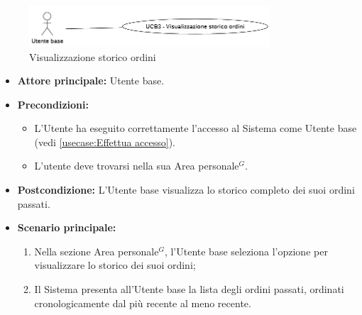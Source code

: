 \label{usecase:Storico ordini}

\begin{figure}[h]
	\centering
	\includegraphics[width=0.8\textwidth]{./uml/UCB3.png} 
	\caption{Visualizzazione storico ordini}
	\label{fig:UCB3}
  \end{figure}

\begin{itemize}
	\item \textbf{Attore principale:} Utente base.

	\item \textbf{Precondizioni:}
	      \begin{itemize}
		      \item L'Utente ha eseguito correttamente l'accesso al Sistema come Utente base (vedi \autoref{usecase:Effettua accesso}).
		      \item L'utente deve trovarsi nella sua Area personale$^G$.
	      \end{itemize}

	\item \textbf{Postcondizione:} L'Utente base visualizza lo storico completo dei suoi ordini passati.

	\item \textbf{Scenario principale:}
	      \begin{enumerate}
		      \item Nella sezione Area personale$^G$, l'Utente base seleziona l'opzione per visualizzare lo storico dei suoi ordini;
		      \item Il Sistema presenta all'Utente base la lista degli ordini passati, ordinati cronologicamente dal più recente al meno recente.
	      \end{enumerate}
\end{itemize}

